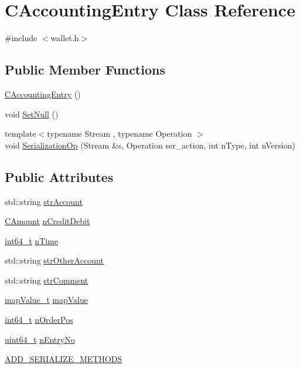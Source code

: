 \hypertarget{class_c_accounting_entry}{}\section{C\+Accounting\+Entry Class Reference}
\label{class_c_accounting_entry}


{\ttfamily \#include $<$wallet.\+h$>$}

\subsection*{Public Member Functions}
\begin{DoxyCompactItemize}
\item 
\hyperlink{class_c_accounting_entry_aa3d75074d67f5c0ca0d1343c1bdfe0f4}{C\+Accounting\+Entry} ()
\item 
void \hyperlink{class_c_accounting_entry_a439b044226a1e465032ce4c4580d3389}{Set\+Null} ()
\item 
{\footnotesize template$<$typename Stream , typename Operation $>$ }\\void \hyperlink{class_c_accounting_entry_ab30195f9f97f8f7ceb17360c24a39676}{Serialization\+Op} (Stream \&s, Operation ser\+\_\+action, int n\+Type, int n\+Version)
\end{DoxyCompactItemize}
\subsection*{Public Attributes}
\begin{DoxyCompactItemize}
\item 
std\+::string \hyperlink{class_c_accounting_entry_a01434c1b0edad576bc1584c9b667ce1d}{str\+Account}
\item 
\hyperlink{amount_8h_a4eaf3a5239714d8c45b851527f7cb564}{C\+Amount} \hyperlink{class_c_accounting_entry_a3a0377685a688c97af2e40581e919b0f}{n\+Credit\+Debit}
\item 
\hyperlink{stdint_8h_adec1df1b8b51cb32b77e5b86fff46471}{int64\+\_\+t} \hyperlink{class_c_accounting_entry_a416a4eb8d47e4c4cfdfc366d9d777ae6}{n\+Time}
\item 
std\+::string \hyperlink{class_c_accounting_entry_a6856c75221e9df5b6a99dda88f45d911}{str\+Other\+Account}
\item 
std\+::string \hyperlink{class_c_accounting_entry_a80c42068f19b13e3201926d340fd10e9}{str\+Comment}
\item 
\hyperlink{wallet_8h_ab1e69952accb0e7c635e4d7f2b19802b}{map\+Value\+\_\+t} \hyperlink{class_c_accounting_entry_a5e3f28cdc5d1fb25472c49c482613fcb}{map\+Value}
\item 
\hyperlink{stdint_8h_adec1df1b8b51cb32b77e5b86fff46471}{int64\+\_\+t} \hyperlink{class_c_accounting_entry_a9c5f78f13a657c1f1fc860a70ef072d5}{n\+Order\+Pos}
\item 
\hyperlink{stdint_8h_aaa5d1cd013383c889537491c3cfd9aad}{uint64\+\_\+t} \hyperlink{class_c_accounting_entry_a0c35da8adbbc529238af70964e0d2b29}{n\+Entry\+No}
\item 
\hyperlink{class_c_accounting_entry_a0251a0be8a3e420b4566b84317ea5fef}{A\+D\+D\+\_\+\+S\+E\+R\+I\+A\+L\+I\+Z\+E\+\_\+\+M\+E\+T\+H\+O\+D\+S}
\end{DoxyCompactItemize}


